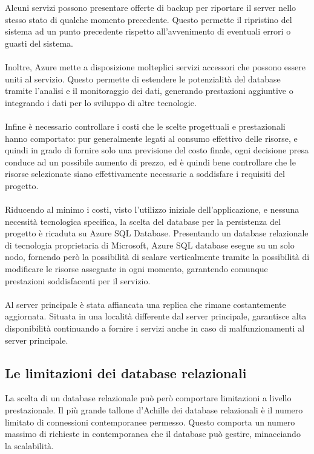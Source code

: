 Alcuni servizi possono presentare offerte di backup per riportare il server nello stesso stato di qualche momento precedente. 
Questo permette il ripristino del sistema ad un punto precedente rispetto all’avvenimento di eventuali errori o guasti del sistema.\\
\\

Inoltre, Azure mette a disposizione molteplici servizi accessori che possono essere uniti al servizio. 
Questo permette di estendere le potenzialità del database tramite  l’analisi e il monitoraggio dei dati, 
generando prestazioni aggiuntive o integrando i dati per lo sviluppo di altre tecnologie.\\
\\
Infine è necessario controllare i costi che le scelte progettuali e prestazionali hanno comportato: 
pur generalmente legati al consumo effettivo delle risorse, e quindi in grado di fornire solo una previsione del costo finale, 
ogni decisione presa conduce ad un possibile aumento di prezzo, 
ed è quindi bene controllare che le risorse selezionate siano effettivamente  necessarie a soddisfare i requisiti del progetto.\\
\\
Riducendo al minimo i costi, visto l’utilizzo iniziale dell’applicazione, e nessuna necessità tecnologica specifica, 
la scelta del database per la persistenza del progetto è ricaduta su Azure SQL Database. 
Presentando un database relazionale di tecnologia proprietaria di Microsoft, Azure SQL database esegue su un solo nodo, 
fornendo però la possibilità di  scalare  verticalmente tramite la possibilità di modificare le risorse assegnate in ogni momento, 
garantendo comunque prestazioni soddisfacenti per il servizio.\\
\\
Al server principale è stata affiancata una replica che rimane costantemente aggiornata. 
Situata in una località differente dal server principale, garantisce alta disponibilità continuando a fornire i servizi anche in caso di malfunzionamenti al server principale.
\clearpage
\subsection{Le limitazioni dei database relazionali}

La scelta di un database relazionale può però comportare limitazioni a livello prestazionale. 
Il più grande tallone d'Achille dei database relazionali è il numero limitato di connessioni contemporanee permesso. 
Questo comporta un numero massimo di richieste in contemporanea che il database può gestire, minacciando la scalabilità. \\
\\


